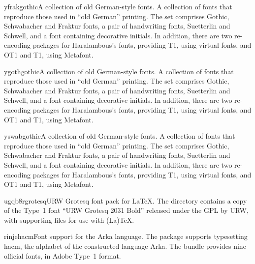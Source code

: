 \documentclass{ddltxtyp}
\begin{document}
\begin{package}{yfrak}{gothic}{A collection of old German-style fonts.}
A collection of fonts that reproduce those used in ``old German''
printing. The set comprises Gothic, Schwabacher and Fraktur
fonts, a pair of handwriting fonts, Suetterlin and Schwell, and
a font containing decorative initials. In addition, there are
two re-encoding packages for Haralambous's fonts, providing T1,
using virtual fonts, and OT1 and T1, using Metafont.
\end{package}
\begin{package}{ygoth}{gothic}{A collection of old German-style fonts.}
A collection of fonts that reproduce those used in ``old German''
printing. The set comprises Gothic, Schwabacher and Fraktur
fonts, a pair of handwriting fonts, Suetterlin and Schwell, and
a font containing decorative initials. In addition, there are
two re-encoding packages for Haralambous's fonts, providing T1,
using virtual fonts, and OT1 and T1, using Metafont.
\end{package}
\begin{package}{yswab}{gothic}{A collection of old German-style fonts.}
A collection of fonts that reproduce those used in ``old German''
printing. The set comprises Gothic, Schwabacher and Fraktur
fonts, a pair of handwriting fonts, Suetterlin and Schwell, and
a font containing decorative initials. In addition, there are
two re-encoding packages for Haralambous's fonts, providing T1,
using virtual fonts, and OT1 and T1, using Metafont.
\end{package}

\begin{package}{ugqb8r}{grotesq}{URW Grotesq font pack for {\LaTeX}.}
The directory contains a copy of the Type~1 font ``URW Grotesq
2031 Bold'' released under the GPL by URW, with supporting files
for use with (La){\TeX}.
\end{package}
\begin{package}{rinje}{hacm}{Font support for the Arka language.}
The package supports typesetting hacm, the alphabet of the
constructed language Arka. The bundle provides nine official
fonts, in Adobe Type~1 format.
\end{package}
\end{document}
